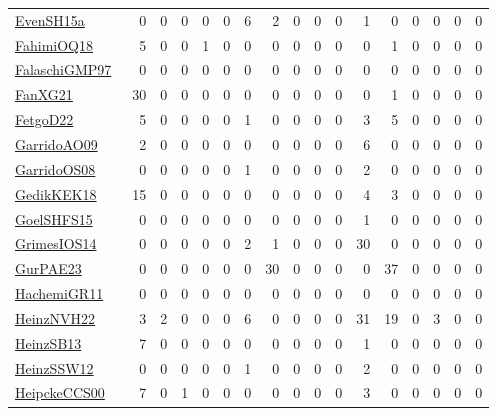 {\begin{longtable}{l*{16}{r}}
\href{articles/EvenSH15a.pdf}{EvenSH15a}~\cite{EvenSH15a} & 0 & 0 & 0 & 0 & 0 & 6 & 2 & 0 & 0 & 0 & 1 & 0 & 0 & 0 & 0 & 0\\
\href{articles/FahimiOQ18.pdf}{FahimiOQ18}~\cite{FahimiOQ18} & 5 & 0 & 0 & 1 & 0 & 0 & 0 & 0 & 0 & 0 & 0 & 1 & 0 & 0 & 0 & 0\\
\href{articles/FalaschiGMP97.pdf}{FalaschiGMP97}~\cite{FalaschiGMP97} & 0 & 0 & 0 & 0 & 0 & 0 & 0 & 0 & 0 & 0 & 0 & 0 & 0 & 0 & 0 & 0\\
\href{articles/FanXG21.pdf}{FanXG21}~\cite{FanXG21} & 30 & 0 & 0 & 0 & 0 & 0 & 0 & 0 & 0 & 0 & 0 & 1 & 0 & 0 & 0 & 0\\
\href{articles/FetgoD22.pdf}{FetgoD22}~\cite{FetgoD22} & 5 & 0 & 0 & 0 & 0 & 1 & 0 & 0 & 0 & 0 & 3 & 5 & 0 & 0 & 0 & 0\\
\href{articles/GarridoAO09.pdf}{GarridoAO09}~\cite{GarridoAO09} & 2 & 0 & 0 & 0 & 0 & 0 & 0 & 0 & 0 & 0 & 6 & 0 & 0 & 0 & 0 & 0\\
\href{articles/GarridoOS08.pdf}{GarridoOS08}~\cite{GarridoOS08} & 0 & 0 & 0 & 0 & 0 & 1 & 0 & 0 & 0 & 0 & 2 & 0 & 0 & 0 & 0 & 0\\
\href{articles/GedikKEK18.pdf}{GedikKEK18}~\cite{GedikKEK18} & 15 & 0 & 0 & 0 & 0 & 0 & 0 & 0 & 0 & 0 & 4 & 3 & 0 & 0 & 0 & 0\\
\href{articles/GoelSHFS15.pdf}{GoelSHFS15}~\cite{GoelSHFS15} & 0 & 0 & 0 & 0 & 0 & 0 & 0 & 0 & 0 & 0 & 1 & 0 & 0 & 0 & 0 & 0\\
\href{articles/GrimesIOS14.pdf}{GrimesIOS14}~\cite{GrimesIOS14} & 0 & 0 & 0 & 0 & 0 & 2 & 1 & 0 & 0 & 0 & 30 & 0 & 0 & 0 & 0 & 0\\
\href{articles/GurPAE23.pdf}{GurPAE23}~\cite{GurPAE23} & 0 & 0 & 0 & 0 & 0 & 0 & 30 & 0 & 0 & 0 & 0 & 37 & 0 & 0 & 0 & 0\\
\href{articles/HachemiGR11.pdf}{HachemiGR11}~\cite{HachemiGR11} & 0 & 0 & 0 & 0 & 0 & 0 & 0 & 0 & 0 & 0 & 0 & 0 & 0 & 0 & 0 & 0\\
\href{articles/HeinzNVH22.pdf}{HeinzNVH22}~\cite{HeinzNVH22} & 3 & 2 & 0 & 0 & 0 & 6 & 0 & 0 & 0 & 0 & 31 & 19 & 0 & 3 & 0 & 0\\
\href{articles/HeinzSB13.pdf}{HeinzSB13}~\cite{HeinzSB13} & 7 & 0 & 0 & 0 & 0 & 0 & 0 & 0 & 0 & 0 & 1 & 0 & 0 & 0 & 0 & 0\\
\href{articles/HeinzSSW12.pdf}{HeinzSSW12}~\cite{HeinzSSW12} & 0 & 0 & 0 & 0 & 0 & 1 & 0 & 0 & 0 & 0 & 2 & 0 & 0 & 0 & 0 & 0\\
\href{articles/HeipckeCCS00.pdf}{HeipckeCCS00}~\cite{HeipckeCCS00} & 7 & 0 & 1 & 0 & 0 & 0 & 0 & 0 & 0 & 0 & 3 & 0 & 0 & 0 & 0 & 0\\

\end{longtable}}
